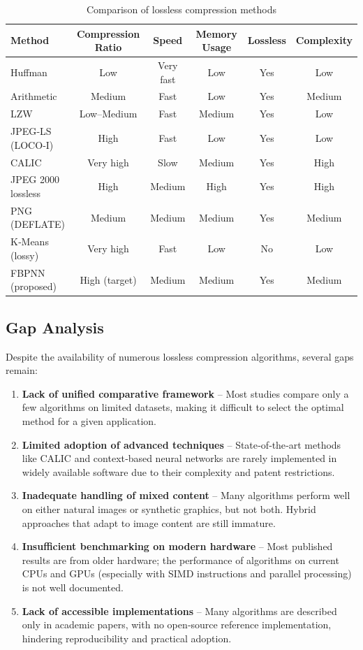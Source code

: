 \begin{table}[H]
\centering
\caption{Comparison of lossless compression methods}
\label{tab:comparison}
\begin{tabular}{@{}lccccc@{}}
\toprule
\textbf{Method} & \textbf{Compression Ratio} & \textbf{Speed} & \textbf{Memory Usage} & \textbf{Lossless} & \textbf{Complexity} \\ \midrule
Huffman         & Low       & Very fast & Low      & Yes & Low   \\
Arithmetic      & Medium    & Fast      & Low      & Yes & Medium \\
LZW             & Low–Medium& Fast      & Medium   & Yes & Low   \\
JPEG‑LS (LOCO‑I)& High      & Fast      & Low      & Yes & Low   \\
CALIC           & Very high & Slow      & Medium   & Yes & High  \\
JPEG 2000 lossless & High & Medium & High & Yes & High \\
PNG (DEFLATE)   & Medium    & Medium    & Medium   & Yes & Medium \\
K‑Means (lossy) & Very high & Fast      & Low      & No  & Low   \\
FBPNN (proposed) & High (target) & Medium & Medium & Yes & Medium \\ \bottomrule
\end{tabular}
\end{table}

\subsection{Gap Analysis}

Despite the availability of numerous lossless compression algorithms, several gaps remain:

\begin{enumerate}
    \item \textbf{Lack of unified comparative framework} – Most studies compare only a few algorithms on limited datasets, making it difficult to select the optimal method for a given application.
    \item \textbf{Limited adoption of advanced techniques} – State‑of‑the‑art methods like CALIC and context‑based neural networks are rarely implemented in widely available software due to their complexity and patent restrictions.
    \item \textbf{Inadequate handling of mixed content} – Many algorithms perform well on either natural images or synthetic graphics, but not both. Hybrid approaches that adapt to image content are still immature.
    \item \textbf{Insufficient benchmarking on modern hardware} – Most published results are from older hardware; the performance of algorithms on current CPUs and GPUs (especially with SIMD instructions and parallel processing) is not well documented.
    \item \textbf{Lack of accessible implementations} – Many algorithms are described only in academic papers, with no open‑source reference implementation, hindering reproducibility and practical adoption.
\end{enumerate}

